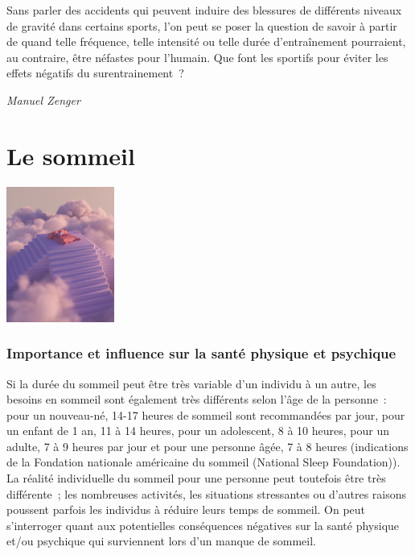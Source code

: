 \documentclass[
  10pt,
  french,
  a5paper,
  openany]{book}
\newenvironment{signature}{\begin{flushright}}{\end{flushright}}
\begin{document}
Sans parler des accidents qui peuvent induire des blessures de différents niveaux de gravité dans certains sports, l'on peut se poser la question de savoir à partir de quand telle fréquence, telle intensité ou telle durée d'entraînement pourraient, au contraire, être néfastes pour l'humain. Que font les sportifs pour éviter les effets négatifs du surentrainement~?

\begin{signature}
\emph{Manuel Zenger}

\end{signature}

\hypertarget{le-sommeil}{%
\chapter{Le sommeil}\label{le-sommeil}}

\begin{center}
\includegraphics[width=\textwidth,height=12em]{images/sommeil.jpg}

\end{center}

\hypertarget{importance-et-influence-sur-la-santuxe9-physique-et-psychique}{%
\subsection*{Importance et influence sur la santé physique et psychique}\label{importance-et-influence-sur-la-santuxe9-physique-et-psychique}}

Si la durée du sommeil peut être très variable d'un individu à un autre, les besoins en sommeil sont également très différents selon l'âge de la personne~: pour un nouveau-né, 14-17 heures de sommeil sont recommandées par jour, pour un enfant de 1 an, 11 à 14 heures, pour un adolescent, 8 à 10 heures, pour un adulte, 7 à 9 heures par jour et pour une personne âgée, 7 à 8 heures (indications de la Fondation nationale américaine du sommeil (National Sleep Foundation)). La réalité individuelle du sommeil pour une personne peut toutefois être très différente~; les nombreuses activités, les situations stressantes ou d'autres raisons poussent parfois les individus à réduire leurs temps de sommeil. On peut s'interroger quant aux potentielles conséquences négatives sur la santé physique et/ou psychique qui surviennent lors d'un manque de sommeil.
\end{document}
